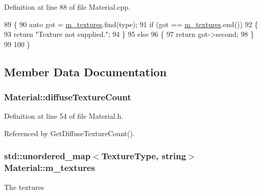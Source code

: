 Definition at line 88 of file Material.\+cpp.


\begin{DoxyCode}
89 \{
90     \textcolor{keyword}{auto} got = \hyperlink{class_material_a4a3c5bccb33c08f476f890aaecdef3d8}{m\_textures}.find(type);
91     \textcolor{keywordflow}{if} (got == \hyperlink{class_material_a4a3c5bccb33c08f476f890aaecdef3d8}{m\_textures}.end())
92     \{
93         \textcolor{keywordflow}{return} \textcolor{stringliteral}{"Texture not supplied."};
94     \}
95     \textcolor{keywordflow}{else}
96     \{
97         \textcolor{keywordflow}{return} got->second;
98     \}
99 
100 \}
\end{DoxyCode}


\subsection{Member Data Documentation}
\subsubsection[{\texorpdfstring{diffuse\+Texture\+Count}{diffuseTextureCount}}]{ Material\+::diffuse\+Texture\+Count\hspace{0.3cm}{\ttfamily [private]}}\hypertarget{class_material_a14ee37446eabace57e0213993e54d8d0}{}\label{class_material_a14ee37446eabace57e0213993e54d8d0}


Definition at line 54 of file Material.\+h.



Referenced by Get\+Diffuse\+Texture\+Count().

\subsubsection[{\texorpdfstring{m\+\_\+textures}{m_textures}}]{\setlength{\rightskip}{0pt plus 5cm}std\+::unordered\+\_\+map$<${\bf Texture\+Type}, {\bf string}$>$ Material\+::m\+\_\+textures\hspace{0.3cm}{\ttfamily [private]}}\hypertarget{class_material_a4a3c5bccb33c08f476f890aaecdef3d8}{}\label{class_material_a4a3c5bccb33c08f476f890aaecdef3d8}


The textures 



